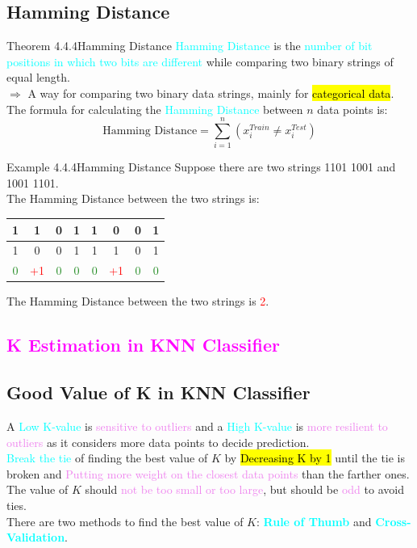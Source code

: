 \documentclass{book}
\begin{document}
\subsection{Hamming Distance}
\begin{thmBox}{Theorem 4.4.4}{Hamming Distance}
    \textcolor{cyan}{Hamming Distance} is the \textcolor{cyan}{number of bit positions in which two bits are different} while comparing two binary strings of equal length.\\
    $\Rightarrow$ A way for comparing two binary data strings, mainly for \hl{categorical data}.\\
    The formula for calculating the \textcolor{cyan}{Hamming Distance} between \(n\) data points is:
    \[
        \text{Hamming Distance} = \sum_{i=1}^{n} (x_i^{Train} \neq x_i^{Test})
    \]
\end{thmBox}
\begin{egBox}{Example 4.4.4}{Hamming Distance}
    Suppose there are two strings 1101 1001 and 1001 1101.\\
    The Hamming Distance between the two strings is:
    \begin{center}
        \begin{tabular}{|c|c|c|c|c|c|c|c|}
            \hline
            1 & 1 & 0 & 1 & 1 & 0 & 0 & 1 \\
            \hline
            1 & 0 & 0 & 1 & 1 & 1 & 0 & 1 \\
            \hline
            \textcolor{forestgreen}{0} & \textcolor{red}{+1} & \textcolor{forestgreen}{0} & \textcolor{forestgreen}{0} & \textcolor{forestgreen}{0} & \textcolor{red}{+1} & \textcolor{forestgreen}{0} & \textcolor{forestgreen}{0} \\
        \end{tabular}
    \end{center}
    The Hamming Distance between the two strings is \textcolor{red}{2}.
\end{egBox}
\textcolor{magenta}{\section{\textbf{K Estimation in KNN Classifier}}}
\subsection{Good Value of K in KNN Classifier}
A \textcolor{cyan}{Low K-value} is \textcolor{violet}{sensitive to outliers} and a \textcolor{cyan}{High K-value} is \textcolor{violet}{more resilient to outliers} as it considers more data points to decide prediction.\\
\textcolor{cyan}{Break the tie} of finding the best value of \(K\) by \hl{Decreasing K by 1} until the tie is broken and \textcolor{violet}{Putting more weight on the closest data points} than the farther ones.\\
The value of \(K\) should \textcolor{violet}{not be too small or too large}, but should be \textcolor{violet}{odd} to avoid ties.\\
There are two methods to find the best value of \(K\): \textcolor{cyan}{\textbf{Rule of Thumb}} and \textcolor{cyan}{\textbf{Cross-Validation}}.
\end{document}
